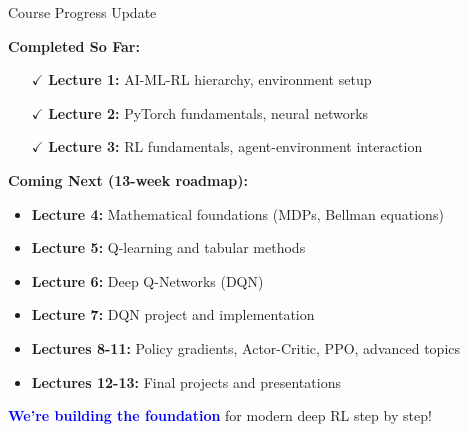 \documentclass[aspectratio=169,10pt]{beamer}
\begin{document}
\begin{frame}{Course Progress Update}

\textbf{Completed So Far:}
\begin{itemize}
    \item[$\checkmark$] \textbf{Lecture 1:} AI-ML-RL hierarchy, environment setup
    \item[$\checkmark$] \textbf{Lecture 2:} PyTorch fundamentals, neural networks  
    \item[$\checkmark$] \textbf{Lecture 3:} RL fundamentals, agent-environment interaction
\end{itemize}

\vfill

\textbf{Coming Next (13-week roadmap):}
\begin{itemize}
    \item \textbf{Lecture 4:} Mathematical foundations (MDPs, Bellman equations)
    \item \textbf{Lecture 5:} Q-learning and tabular methods
    \item \textbf{Lecture 6:} Deep Q-Networks (DQN)
    \item \textbf{Lecture 7:} DQN project and implementation
    \item \textbf{Lectures 8-11:} Policy gradients, Actor-Critic, PPO, advanced topics
    \item \textbf{Lectures 12-13:} Final projects and presentations
\end{itemize}

\vfill

\textcolor{blue}{\textbf{We're building the foundation}} for modern deep RL step by step!

\end{frame}
\end{document}
